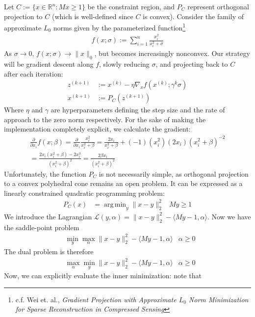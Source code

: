 \documentclass{article}
\newcommand{\R}{{\mathbb{R}}}
\DeclareMathOperator*{\argmin}{arg\,min}
\begin{document}
Let $C := \{x \in \R^n : Mx \geq 1\}$ be the constraint region, and $P_C$ represent orthogonal projection to $C$ (which is well-defined since $C$ is convex). Consider the family of approximate $L_0$ norms given by the parameterized function\footnote{c.f. Wei et. al., \emph{Gradient Projection with Approximate $L_0$ Norm Minimization for Sparse Reconstruction in Compressed Sensing}}
\begin{align}
		f(x; \sigma) := \sum_{i=1}^n \frac{x_i^2}{x_i^2 + \sigma}
\end{align}
As $\sigma \rightarrow 0$, $f(x; \sigma) \rightarrow \|x\|_0$, but becomes increasingly nonconvex. Our strategy will be gradient descent along $f$, slowly reducing $\sigma$, and projecting back to $C$ after each iteration:
\begin{align}
		z^{(k+1)} &:= x^{(k)} - \eta \nabla_x f(x^{(k)}; \gamma^k \sigma) \\
		x^{(k+1)} &:= P_C(z^{(k+1)})
\end{align}
Where $\eta$ and $\gamma$ are hyperparameters defining the step size and the rate of approach to the zero norm respectively. For the sake of making the implementation completely explicit, we calculate the gradient:
\begin{align}
		\frac{\partial}{\partial x_i} f(x; \beta) = \frac{\partial}{\partial x_i} \frac{x_i^2}{x_i^2 + \beta} = \frac{2x_i}{x_i^2 + \beta} + (-1)(x_i^2)(2x_i)(x_i^2 + \beta)^{-2}\\
		= \frac{2x_i(x_i^2 + \beta) - 2x_i^3}{(x_i^2 + \beta)^2} = \frac{2\beta x_i}{(x_i^2 + \beta)^2}
\end{align}
Unfortunately, the function $P_C$ is not necessarily simple, as orthogonal projection to a convex polyhedral cone remains an open problem. It can be expressed as a linearly constrained quadratic programming problem:
\begin{align}
		P_C(x) &= \argmin_y \|x-y\|_2^2 & My \geq 1
\end{align}
We introduce the Lagrangian $\mathcal{L}(y, \alpha) = \|x-y\|_2^2 - \langle My-1, \alpha\rangle$. Now we have the saddle-point problem
\begin{align}
		&\min_y \max_\alpha \|x-y\|_2^2 - \langle My - 1, \alpha\rangle & \alpha \geq 0
\end{align}
The dual problem is therefore
\begin{align}
		&\max_\alpha \min_y \|x-y\|_2^2 - \langle My - 1, \alpha\rangle & \alpha \geq 0
\end{align}
Now, we can explicitly evaluate the inner minimization: note that
\end{document}
